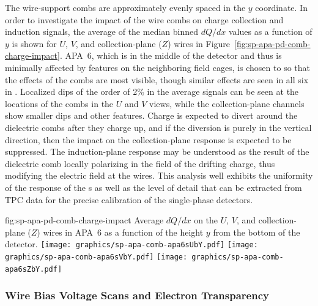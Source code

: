The wire-support combs are approximately evenly spaced in the $y$ coordinate.  In order to investigate the impact of the wire combs on charge collection and induction signals, the average of the median binned $dQ/dx$ values as a function of $y$ is shown for $U$, $V$, and collection-plane ($Z$) wires in Figure~\ref{fig:sp-apa-pd-comb-charge-impact}.  APA~6, which is in the middle of the detector and thus is minimally affected by features on the neighboring field cages, is chosen to so that the effects of the combs are most visible, though similar effects are seen in all six  in .  Localized dips of the order of 2\% in the average signals can be seen at the locations of the combs in the $U$ and $V$ views, while the collection-plane channels show smaller dips and other features.  Charge is expected to divert around the dielectric combs after they charge up, and if the diversion is purely in the vertical direction, then the impact on the collection-plane response is expected to be suppressed.  The induction-plane response may be understood as the result of the dielectric comb locally polarizing in the field of the drifting charge, thus modifying the electric field at the wires.  This analysis well exhibits the uniformity of the response of the  s as well as the level of detail that can be extracted from TPC data for the precise calibration of the single-phase detectors.

\begin{dunefigure}{fig:sp-apa-pd-comb-charge-impact}
{Average $dQ/dx$ on the $U$, $V$, and collection-plane ($Z$) wires in APA~6 as a function of the height $y$ from the bottom of the  detector. }
\texttt{[image: graphics/sp-apa-comb-apa6sUbY.pdf]}
\texttt{[image: graphics/sp-apa-comb-apa6sVbY.pdf]}
\texttt{[image: graphics/sp-apa-comb-apa6sZbY.pdf]}   
\end{dunefigure}

\subsubsection{Wire Bias Voltage Scans and Electron Transparency}
\label{sec:fdsp-apa-qa-protodune-ops-bias-scans}


